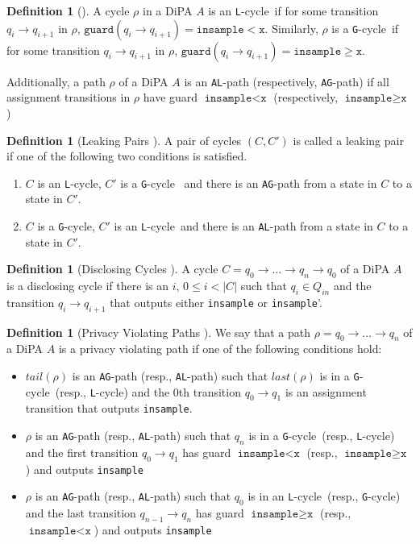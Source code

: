 \documentclass[12pt]{article}
\newcommand{\gguard}[1][x]{\texttt{insample}\geq #1}
\newcommand{\lguard}[1][x]{\texttt{insample} < #1}
\newcommand{\guard}{\texttt{guard}}
\newcommand{\gcycle}{\texttt{G}-cycle}
\newcommand{\lcycle}{\texttt{L}-cycle}
\theoremstyle{definition}
\newtheorem{defn}[thm]{Definition}
\begin{document}
\begin{defn}[\cite{chadhaLinearTimeDecidability2021}]
    A cycle $\rho$ in a DiPA $A$ is an \lcycle~if for some transition $q_i\to q_{i+1}$ in $\rho$, $\guard(q_i\to q_{i+1}) = \lguard[\texttt{x}]$. Similarly, $\rho$ is a \gcycle~if for some transition $q_i\to q_{i+1}$ in $\rho$, $\guard(q_i\to q_{i+1}) = \gguard[\texttt{x}]$.
    
    Additionally, a path $\rho$ of a DiPA $A$ is an \texttt{AL}-path (respectively, \texttt{AG}-path) if all assignment transitions in $\rho$ have guard $\lguard[\texttt{x}]$ (respectively, $\gguard[\texttt{x}]$)
\end{defn}

\begin{defn}[Leaking Pairs \cite{chadhaLinearTimeDecidability2021}]
    A pair of cycles $(C, C')$ is called a leaking pair if one of the following two conditions is satisfied.
    \begin{enumerate}
        \item $C$ is an \lcycle, $C'$ is a \gcycle~ and there is an \texttt{AG}-path from a state in $C$ to a state in $C'$.
        \item $C$ is a \gcycle, $C'$ is an \lcycle~and there is an \texttt{AL}-path from a state in $C$ to a state in $C'$.
    \end{enumerate}
\end{defn}

\begin{defn}[Disclosing Cycles \cite{chadhaLinearTimeDecidability2021}]
    A cycle $C = q_0\to \ldots \to q_n \to q_0$ of a DiPA $A$ is a disclosing cycle if there is an $i$, $0 \leq i < |C|$ such that $q_i\in Q_{in}$ and the transition $q_i\to q_{i+1}$ that outputs either \texttt{insample} or \texttt{insample}'.
\end{defn}

\begin{defn}[Privacy Violating Paths \cite{chadhaLinearTimeDecidability2021}]
    We say that a path $\rho = q_0\to\ldots \to q_n $ of a DiPA $A$ is a privacy violating path if one of the following conditions hold:
    \begin{itemize}
        \item  $tail(\rho)$ is an \texttt{AG}-path (resp., \texttt{AL}-path) such that $last(\rho)$ is in a \gcycle~(resp., \lcycle) and the 0th transition $q_0\to q_1$ is an assignment transition that outputs \texttt{insample}.
        \item $\rho$ is an \texttt{AG}-path (resp., \texttt{AL}-path) such that $q_n$ is in a \gcycle~(resp., \lcycle) and the first transition $q_0\to q_1$ has guard $\lguard[\texttt{x}]$ (resp., $\gguard[\texttt{x}]$) and outputs \texttt{insample}
        \item $\rho$ is an \texttt{AG}-path (resp., \texttt{AL}-path) such that $q_0$ is in an \lcycle~(resp., \gcycle) and the last transition $q_{n-1}\to q_n$ has guard $\gguard[\texttt{x}]$ (resp., $\lguard[\texttt{x}]$) and outputs \texttt{insample}
    \end{itemize}
\end{defn}
\end{document}

